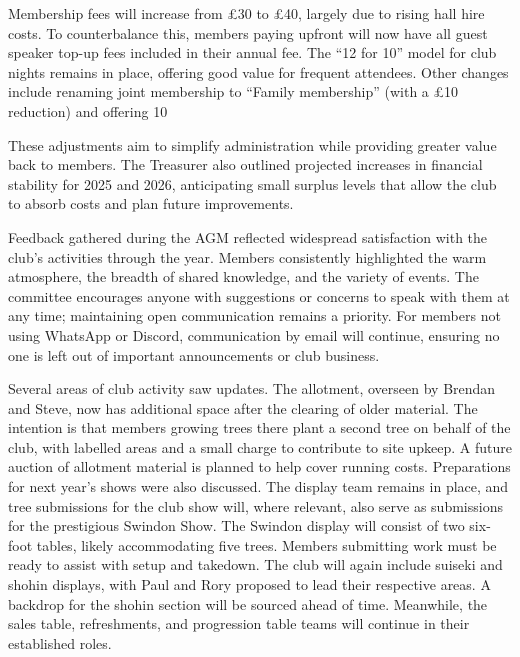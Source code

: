 Membership fees will increase from £30 to £40, largely due to rising hall hire costs. To counterbalance this, members paying upfront will now have all guest speaker top-up fees included in their annual fee. The “12 for 10” model for club nights remains in place, offering good value for frequent attendees. Other changes include renaming joint membership to “Family membership” (with a £10 reduction) and offering 10%

These adjustments aim to simplify administration while providing greater value back to members. The Treasurer also outlined projected increases in financial stability for 2025 and 2026, anticipating small surplus levels that allow the club to absorb costs and plan future improvements.

\medskip
{}
\noindent
Feedback gathered during the AGM reflected widespread satisfaction with the club’s activities through the year. Members consistently highlighted the warm atmosphere, the breadth of shared knowledge, and the variety of events. The committee encourages anyone with suggestions or concerns to speak with them at any time; maintaining open communication remains a priority.
%
For members not using WhatsApp or Discord, communication by email will continue, ensuring no one is left out of important announcements or club business.

\medskip
{}
\noindent
Several areas of club activity saw updates. The allotment, overseen by Brendan and Steve, now has additional space after the clearing of older material. The intention is that members growing trees there plant a second tree on behalf of the club, with labelled areas and a small charge to contribute to site upkeep. A future auction of allotment material is planned to help cover running costs.
%
Preparations for next year's shows were also discussed. The display team remains in place, and tree submissions for the club show will, where relevant, also serve as submissions for the prestigious Swindon Show. The Swindon display will consist of two six-foot tables, likely accommodating five trees. Members submitting work must be ready to assist with setup and takedown.
%
The club will again include suiseki and shohin displays, with Paul and Rory proposed to lead their respective areas. A backdrop for the shohin section will be sourced ahead of time. Meanwhile, the sales table, refreshments, and progression table teams will continue in their established roles.

